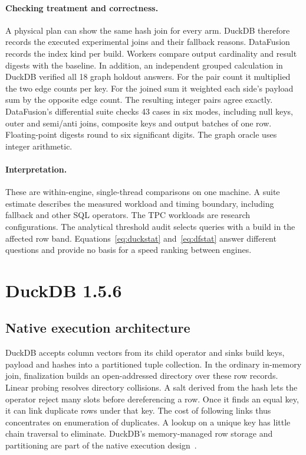 \documentclass[11pt,a4paper]{article}
\begin{document}
\paragraph{Checking treatment and correctness.}
A physical plan can show the same hash join for every arm. DuckDB therefore records the executed
experimental joins and their fallback reasons. DataFusion records the index kind per build.
Workers compare output cardinality and result digests with the baseline. In addition, an
independent grouped calculation in DuckDB verified all 18 graph holdout answers. For the pair
count it multiplied the two edge counts per key. For the joined sum it weighted each side's
payload sum by the opposite edge count. The resulting integer pairs agree exactly. DataFusion's
differential suite checks 43 cases in six modes, including null keys, outer and semi/anti joins,
composite keys and output batches of one row. Floating-point digests round to six significant
digits. The graph oracle uses integer arithmetic.

\paragraph{Interpretation.}
These are within-engine, single-thread comparisons on one machine. A suite estimate describes the
measured workload and timing boundary, including fallback and other SQL operators. The TPC
workloads are research configurations. The analytical threshold audit selects queries with a build
in the affected row band. Equations~\eqref{eq:duckstat} and~\eqref{eq:dfstat} answer different
questions and provide no basis for a speed ranking between engines.

\clearpage
\section{DuckDB 1.5.6}
\label{sec:duck}
\subsection{Native execution architecture}
DuckDB accepts column vectors from its child operator and sinks build keys, payload and hashes
into a partitioned tuple collection. In the ordinary in-memory join, finalization builds an
open-addressed directory over these row records. Linear probing resolves directory collisions. A
salt derived from the hash lets the operator reject many slots before dereferencing a row. Once it
finds an equal key, it can link duplicate rows under that key. The cost of following links thus
concentrates on enumeration of duplicates. A lookup on a unique key has little chain traversal to
eliminate. DuckDB's memory-managed row storage and partitioning are part of the native execution
design~\cite{kuiper}.
\end{document}

